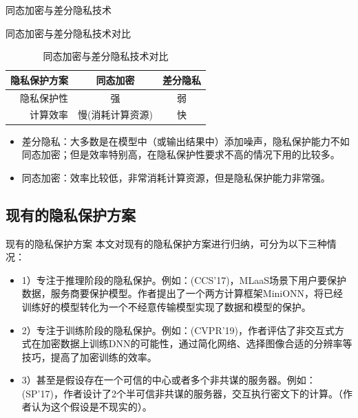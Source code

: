 \documentclass{beamer}
\begin{document}
\begin{frame}{同态加密与差分隐私技术}
\begin{exampleblock}{同态加密与差分隐私技术对比}
\begin{table}[htpb]
            \centering
            \caption{同态加密与差分隐私技术对比}
            \label{tab:number}
            \begin{tabular}{rcc}\toprule
            	隐私保护方案 & 同态加密 & 差分隐私 \\\midrule
            	隐私保护性 & 强 & 弱 \\
            	计算效率 & 慢(消耗计算资源) & 快 \\\bottomrule
            \end{tabular}
\end{table}
\begin{itemize}
		\item {\footnotesize 差分隐私：大多数是在模型中（或输出结果中）添加噪声，隐私保护能力不如同态加密；但是效率特别高，在隐私保护性要求不高的情况下用的比较多。}
		\item {\footnotesize 同态加密：效率比较低，非常消耗计算资源，但是隐私保护能力非常强。}

	\end{itemize}
\end{exampleblock}
\end{frame}




\subsection{现有的隐私保护方案}
\begin{frame}{现有的隐私保护方案}
	本文对现有的隐私保护方案进行归纳，可分为以下三种情况：
	\begin{itemize}
        \item {\footnotesize {\color {red}1）专注于推理阶段的隐私保护。}例如：\cite{liu2017oblivious}(CCS'17)，MLaaS场景下用户要保护数据，服务商要保护模型。作者提出了一个两方计算框架MiniONN，将已经训练好的模型转化为一个不经意传输模型实现了数据和模型的保护。}
        \item {\footnotesize {\color {red}2）专注于训练阶段的隐私保护。}例如：\cite{nandakumar2019towards}(CVPR'19)，作者评估了非交互式方式在加密数据上训练DNN的可能性，通过简化网络、选择图像合适的分辨率等技巧，提高了加密训练的效率。}
        \item {\footnotesize{\color {red}3）甚至是假设存在一个可信的中心或者多个非共谋的服务器。}例如：\cite{mohassel2017secureml}(SP'17)，作者设计了2个半可信非共谋的服务器，交互执行密文下的计算。（作者认为这个假设是不现实的）。}
    	\end{itemize}
\end{frame}
\end{document}
